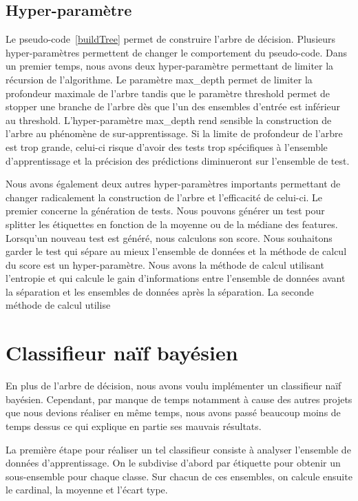 \documentclass[french, 14pt]{memoir}
\begin{document}
\subsection{Hyper-paramètre}

Le pseudo-code~\ref{buildTree} permet de construire l'arbre de décision. Plusieurs hyper-paramètres permettent de changer le comportement du pseudo-code. Dans un premier temps, nous avons deux hyper-paramètre permettant de limiter la récursion de l'algorithme. Le paramètre max\_depth permet de limiter la profondeur maximale de l'arbre tandis que le paramètre threshold permet de stopper une branche de l'arbre dès que l'un des ensembles d'entrée est inférieur au threshold. L'hyper-paramètre max\_depth rend sensible la construction de l'arbre au phénomène de sur-apprentissage. Si la limite de profondeur de l'arbre est trop grande, celui-ci risque d'avoir des tests trop spécifiques à l'ensemble d'apprentissage et la précision des prédictions diminueront sur l'ensemble de test.

Nous avons également deux autres hyper-paramètres importants permettant de changer radicalement la construction de l'arbre et l'efficacité de celui-ci. Le premier concerne la génération de tests. Nous pouvons générer un test pour splitter les étiquettes en fonction de la moyenne ou de la médiane des features. Lorsqu'un nouveau test est généré, nous calculons son score. Nous souhaitons garder le test qui sépare au mieux l'ensemble de données et la méthode de calcul du score est un hyper-paramètre. Nous avons la méthode de calcul utilisant l'entropie et qui calcule le gain d'informations entre l'ensemble de données avant la séparation et les ensembles de données après la séparation. La seconde méthode de calcul utilise 


\section{Classifieur naïf bayésien}

En plus de l'arbre de décision, nous avons voulu implémenter un classifieur naïf bayésien. Cependant, par manque de temps notamment à cause des autres projets que nous devions réaliser en même temps, nous avons passé beaucoup moins de temps dessus ce qui explique en partie ses mauvais résultats.

La première étape pour réaliser un tel classifieur consiste à analyser l'ensemble de données d'apprentissage. On le subdivise d'abord par étiquette pour obtenir un sous-ensemble pour chaque classe. Sur chacun de ces ensembles, on calcule ensuite le cardinal, la moyenne et l'écart type.
\end{document}
